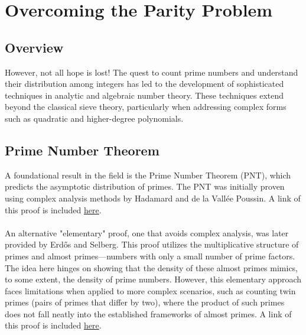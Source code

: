 \pagebreak
\section{Overcoming the Parity Problem}
\subsection{Overview}
However, not all hope is lost! The quest to count prime numbers and understand their distribution among integers has led to the development of sophisticated techniques in analytic and algebraic number theory. 
These techniques extend beyond the classical sieve theory, particularly when addressing complex forms such as quadratic and higher-degree polynomials.

\subsection{Prime Number Theorem}
A foundational result in the field is the Prime Number Theorem (PNT), which predicts the asymptotic distribution of primes. The PNT was initially proven using complex analysis methods by Hadamard and de la Vallée Poussin. A link of this proof is included \href{https://people.mpim-bonn.mpg.de/zagier/files/doi/10.2307/2975232/fulltext.pdf}{here}. \\
\\
An alternative "elementary" proof, one that avoids complex analysis, was later provided by Erdős and Selberg. This proof utilizes the multiplicative structure of primes and almost primes—numbers with only a small number of prime factors. The idea here hinges on showing that the density of these almost primes mimics, to some extent, the density of prime numbers. However, this elementary approach faces limitations when applied to more complex scenarios, such as counting twin primes (pairs of primes that differ by two), where the product of such primes does not fall neatly into the established frameworks of almost primes. A link of this proof is included \href{https://www.math.columbia.edu/~goldfeld/ErdosSelbergDispute.pdf}{here}.


